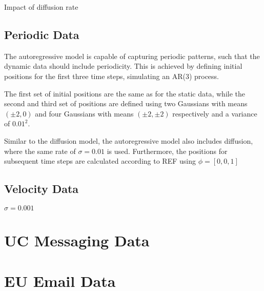         Impact of diffusion rate
        
    
    \subsection{Periodic Data}
    
        The autoregressive model is capable of capturing periodic patterns, such that the dynamic data should include periodicity. This is achieved by defining initial positions for the first three time steps, simulating an AR(3) process. 
        
        The first set of initial positions are the same as for the static data, while the second and third set of positions are defined using two Gaussians with means $(\pm2,0)$ and four Gaussians with means $(\pm2,\pm2)$ respectively and a variance of $0.01^2$.
       
        
        Similar to the diffusion model, the autoregressive model also includes diffusion, where the same rate of $\sigma=0.01$ is used. Furthermore, the positions for subsequent time steps are calculated according to REF using $\phi=[0, 0, 1]$
        
        
        
    \subsection{Velocity Data}
    
        $\sigma=0.001$
        
\section{UC Messaging Data}

    
\section{EU Email Data}

